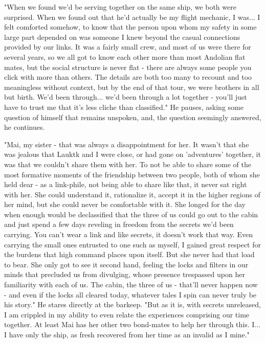 "When we found we'd be serving together on the same ship, we both were
surprised. When we found out that he'd actually be my flight mechanic,
I was...  I felt comforted somehow, to know that the person upon whom
my safety in some large part depended on was someone I knew beyond the
casual connections provided by our links. It was a fairly small crew,
and most of us were there for several years, so we all got to know
each other more than most Andolian flat mates, but the social
structure is never flat - there are always some people you click with
more than others.  The details are both too many to recount and too
meaningless without context, but by the end of that tour, we were
brothers in all but birth.  We'd been through... we'd been through a
lot together - you'll just have to trust me that it's less cliche than
classified." He pauses, asking some question of himself that remains
unspoken, and, the question seemingly answered, he continues.

"Mai, my sister - that was always a disappointment for her.  It wasn't
that she was jealous that Lauktk and I were close, or had gone on
'adventures' together, it was that we couldn't share them with her. To
not be able to share some of the most formative moments of the
friendship between two people, both of whom she held dear - as a
link-phile, not being able to share like that, it never sat right with
her. She could understand it, rationalize it, accept it in the higher
regions of her mind, but she could never be comfortable with it. She
longed for the day when enough would be declassified that the three of
us could go out to the cabin and just spend a few days reveling in
freedom from the secrets we'd been carrying.  You can't wear a link
and like secrets, it doesn't work that way.  Even carrying the small
ones entrusted to one such as myself, I gained great respect for the
burdens that high command places upon itself. But she never had that
load to bear. She only got to see it second hand, feeling the locks
and filters in our minds that precluded us from divulging, whose
presence trespassed upon her familiarity with each of us.  The cabin,
the three of us - that'll never happen now - and even if the locks all
cleared today, whatever tales I spin can never truly be his story." He
stares directly at the barkeep.  "But as it is, with secrets
unreleased, I am crippled in my ability to even relate the experiences
comprising our time together. At least Mai has her other two
bond-mates to help her through this. I... I have only the ship, as
fresh recovered from her time as an invalid as I mine."

